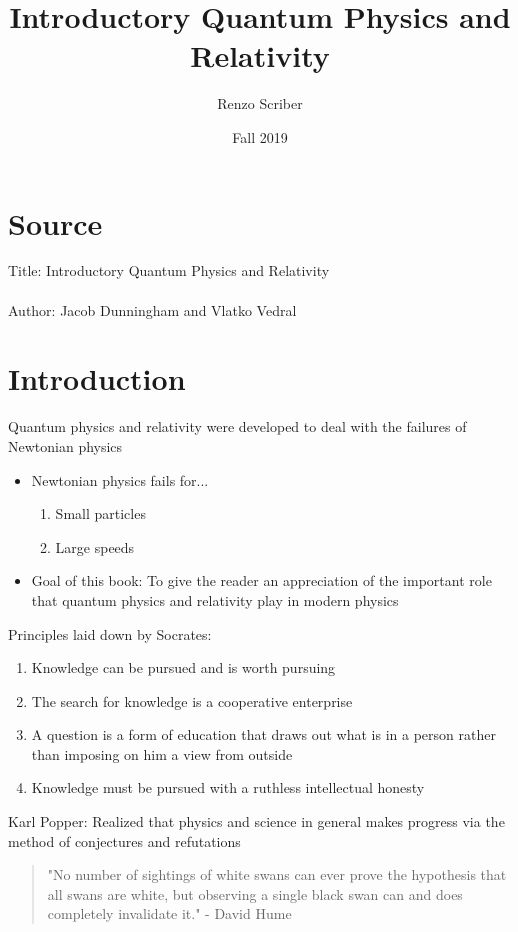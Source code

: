\documentclass[a4paper]{article}
\title{Introductory Quantum Physics and Relativity}
\author{Renzo Scriber}
\date{Fall 2019}
\begin{document}
\maketitle

\section*{Source}
Title: Introductory Quantum Physics and Relativity
\\
\\
Author: Jacob Dunningham and Vlatko Vedral
\section{Introduction}
Quantum physics and relativity were developed to deal with the failures of Newtonian physics
    \begin{itemize}
        \item Newtonian physics fails for...
            \begin{enumerate}
                \item Small particles
                \item Large speeds
            \end{enumerate}
        \item Goal of this book: To give the reader an appreciation of the important role that quantum physics and relativity play in modern physics
    \end{itemize}
Principles laid down by Socrates:
    \begin{enumerate}
        \item Knowledge can be pursued and is worth pursuing
        \item The search for knowledge is a cooperative enterprise
        \item A question is a form of education that draws out what is in a person rather than imposing on him a view from outside
        \item Knowledge must be pursued with a ruthless intellectual honesty
    \end{enumerate}
Karl Popper: Realized that physics and science in general makes progress via the method of conjectures and refutations 
    \begin{quote}
        "No number of sightings of white swans can ever prove the hypothesis that all swans are white, but observing a single black swan can and does completely invalidate it." - David Hume
    \end{quote}
\end{document}
